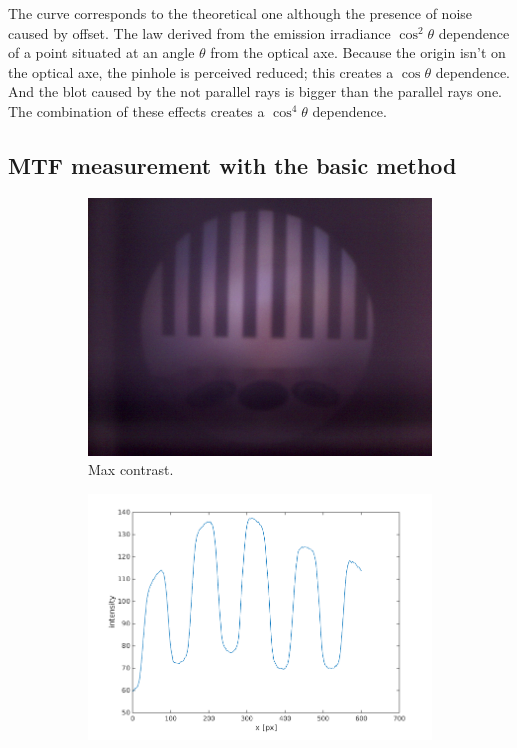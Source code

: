 \documentclass[a4paper, 12pt]{paper}
\begin{document}
The curve corresponds to the theoretical one although the presence of noise caused by offset.
The law derived from the emission irradiance $\cos^2 \theta$ dependence of a point situated at an angle $\theta$ from the optical axe.
Because the origin isn’t on the optical axe, the pinhole is perceived reduced; this creates a $\cos \theta$ dependence.
And the blot caused by the not parallel rays is bigger than the parallel rays one.
The combination of these effects creates a $\cos^4 \theta$ dependence. 

\subsection{MTF measurement with the basic method}



\begin{figure}[H]
    \centering
    \begin{subfigure}[t]{0.40\textwidth}
        \includegraphics[width=\textwidth]{img/100}
        \caption{Max contrast.}
    \end{subfigure}
    \begin{subfigure}[t]{0.45\textwidth}
        \includegraphics[width=\textwidth]{img/line_plot_100}

\end{subfigure}
\end{figure}
\end{document}
